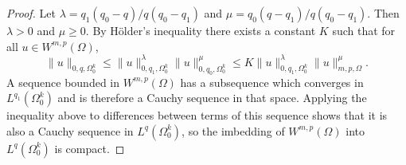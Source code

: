 \begin{proof}
  Let $\lambda = q_1(q_0-q)/q(q_0-q_1)$ and $\mu = q_0(q-q_1)/q(q_0-q_1)$.
  Then $\lambda>0$ and $\mu\geq 0$. By H\"older's inequality there exists a constant
  $K$ such that for all $u\in W^{m,p}(\Omega)$,
  \[ \|u\|_{0,q,\Omega_0^k} \leq \|u\|_{0,q_1,\Omega_0^k}^\lambda \|u\|_{0,q_0,\Omega_0^k}^\mu
      \leq K \|u\|_{0,q_1,\Omega_0^k}^\lambda \|u\|_{m,p,\Omega}^\mu. \]
  A sequence bounded in $W^{m,p}(\Omega)$ has a subsequence which converges in
  $L^{q_1}(\Omega_0^k)$ and is therefore a Cauchy sequence in that space.
  Applying the inequality above to differences between terms of this sequence shows
  that it is also a Cauchy sequence in $L^q(\Omega_0^k)$, so the imbedding
  of $W^{m,p}(\Omega)$ into $L^q(\Omega_0^k)$ is compact.
\end{proof}


